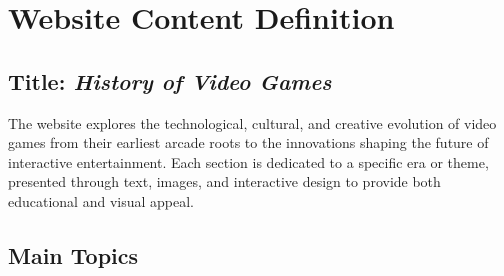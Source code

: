 \documentclass[a4paper,12pt]{article}
\begin{document}
\section*{Website Content Definition}

\subsection*{Title: \textit{History of Video Games}}

\noindent
The website explores the technological, cultural, and creative evolution of video games from their earliest arcade roots to the innovations shaping the future of interactive entertainment.  
Each section is dedicated to a specific era or theme, presented through text, images, and interactive design to provide both educational and visual appeal.

\vspace{0.5cm}
\subsection*{Main Topics}
\end{document}
